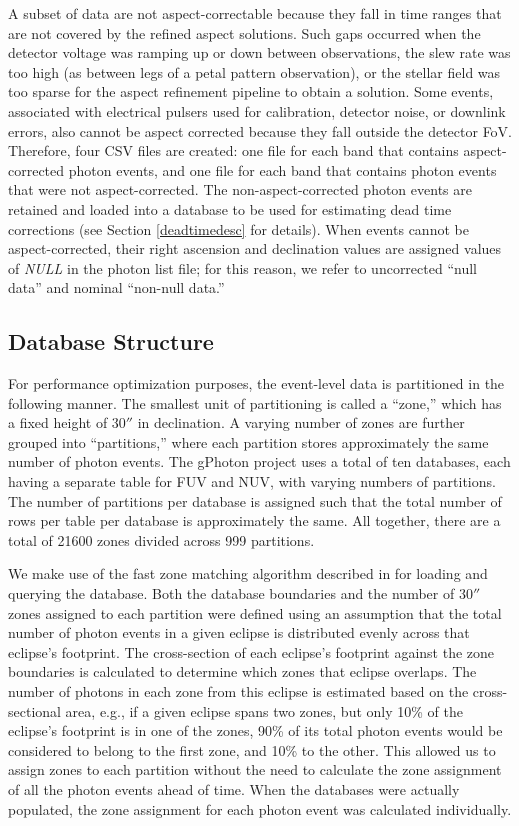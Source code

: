 \documentclass[preprint]{aastex}
\begin{document}
A subset of data are not aspect-correctable because they fall in time ranges that are not covered by the refined aspect solutions. Such gaps occurred when the detector voltage was ramping up or down between observations, the slew rate was too high (as between legs of a petal pattern observation), or the stellar field was too sparse for the aspect refinement pipeline to obtain a solution. Some events, associated with electrical pulsers used for calibration, detector noise, or downlink errors, also cannot be aspect corrected because they fall outside the detector FoV. Therefore, four CSV files are created: one file for each band that contains aspect-corrected photon events, and one file for each band that contains photon events that were not aspect-corrected. The non-aspect-corrected photon events are retained and loaded into a database to be used for estimating dead time corrections (see Section \ref{deadtimedesc} for details). When events cannot be aspect-corrected, their right ascension and declination values are assigned values of \emph{NULL} in the photon list file; for this reason, we refer to uncorrected ``null data'' and nominal ``non-null data.''

\subsection{Database Structure}
For performance optimization purposes, the event-level data is partitioned in the following manner.  The smallest unit of partitioning is called a ``zone,'' which has a fixed height of $30''$ in declination.  A varying number of zones are further grouped into ``partitions,'' where each partition stores approximately the same number of photon events. The gPhoton project uses a total of ten databases, each having a separate table for FUV and NUV, with varying numbers of partitions.  The number of partitions per database is assigned such that the total number of rows per table per database is approximately the same. All together, there are a total of 21600 zones divided across 999 partitions.

We make use of the fast zone matching algorithm described in \citet{gra2006} for loading and querying the database. Both the database boundaries and the number of $30''$ zones assigned to each partition were defined using an assumption that the total number of photon events in a given eclipse is distributed evenly across that eclipse's footprint. The cross-section of each eclipse's footprint against the zone boundaries is calculated to determine which zones that eclipse overlaps. The number of photons in each zone from this eclipse is estimated based on the cross-sectional area, e.g., if a given eclipse spans two zones, but only 10\% of the eclipse's footprint is in one of the zones, 90\% of its total photon events would be considered to belong to the first zone, and 10\% to the other. This allowed us to assign zones to each partition without the need to calculate the zone assignment of all the photon events ahead of time. When the databases were actually populated, the zone assignment for each photon event was calculated individually.
\end{document}
